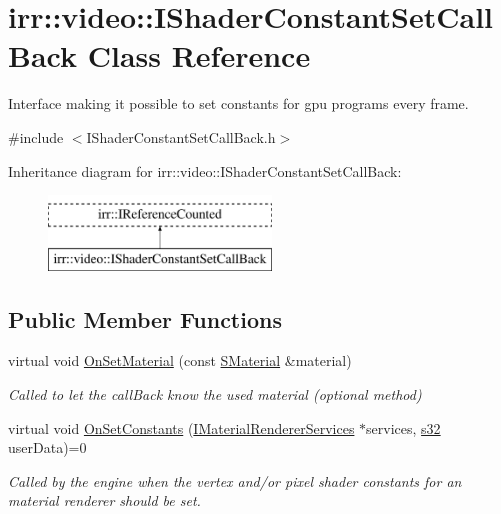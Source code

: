 \hypertarget{classirr_1_1video_1_1IShaderConstantSetCallBack}{}\section{irr\+:\+:video\+:\+:I\+Shader\+Constant\+Set\+Call\+Back Class Reference}
\label{classirr_1_1video_1_1IShaderConstantSetCallBack}


Interface making it possible to set constants for gpu programs every frame.  




{\ttfamily \#include $<$I\+Shader\+Constant\+Set\+Call\+Back.\+h$>$}

Inheritance diagram for irr\+:\+:video\+:\+:I\+Shader\+Constant\+Set\+Call\+Back\+:\begin{figure}[H]
\begin{center}
\leavevmode
\includegraphics[height=2.000000cm]{classirr_1_1video_1_1IShaderConstantSetCallBack}
\end{center}
\end{figure}
\subsection*{Public Member Functions}
\begin{DoxyCompactItemize}
\item 
virtual void \hyperlink{classirr_1_1video_1_1IShaderConstantSetCallBack_a837ad9419ca4c17b011af75bb24e7a72}{On\+Set\+Material} (const \hyperlink{classirr_1_1video_1_1SMaterial}{S\+Material} \&material)
\begin{DoxyCompactList}\small\item\em Called to let the call\+Back know the used material (optional method) \end{DoxyCompactList}\item 
virtual void \hyperlink{classirr_1_1video_1_1IShaderConstantSetCallBack_a91cf4eb8d20d278defaca4e3c9390396}{On\+Set\+Constants} (\hyperlink{classirr_1_1video_1_1IMaterialRendererServices}{I\+Material\+Renderer\+Services} $\ast$services, \hyperlink{namespaceirr_ac66849b7a6ed16e30ebede579f9b47c6}{s32} user\+Data)=0
\begin{DoxyCompactList}\small\item\em Called by the engine when the vertex and/or pixel shader constants for an material renderer should be set. \end{DoxyCompactList}\end{DoxyCompactItemize}
